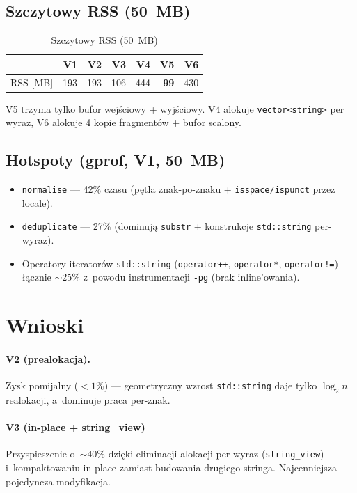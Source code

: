 \documentclass[11pt,a4paper]{article}
\begin{document}
\subsection{Szczytowy RSS (50~MB)}

\begin{table}[h]\centering
\begin{tabular}{lrrrrrr}
\toprule
  & V1 & V2 & V3 & V4 & V5 & V6 \\
\midrule
RSS [MB] & 193 & 193 & 106 & 444 & \textbf{99} & 430 \\
\bottomrule
\end{tabular}
\caption{Szczytowy RSS (50~MB)}
V5 trzyma tylko bufor wejściowy + wyjściowy. V4 alokuje \texttt{vector<string>} per wyraz, V6 alokuje 4 kopie fragmentów + bufor scalony.
\end{table}

\subsection{Hotspoty (gprof, V1, 50~MB)}
\begin{itemize}\itemsep0pt
  \item \texttt{normalise} --- 42\% czasu (pętla znak-po-znaku + \texttt{isspace/ispunct} przez locale).
  \item \texttt{deduplicate} --- 27\% (dominują \texttt{substr} + konstrukcje \texttt{std::string} per-wyraz).
  \item Operatory iteratorów \texttt{std::string} (\texttt{operator++}, \texttt{operator*}, \texttt{operator!=}) --- łącznie $\sim$25\% z~powodu instrumentacji \texttt{-pg} (brak inline'owania).
\end{itemize}

\section{Wnioski}

\paragraph{V2 (prealokacja).} Zysk pomijalny ($<1\%$) --- geometryczny wzrost \texttt{std::string} daje tylko $\log_2 n$ realokacji, a~dominuje praca per-znak.

\paragraph{V3 (in-place + string\_view)} Przyspieszenie o~$\sim$40\% dzięki eliminacji alokacji per-wyraz (\texttt{string\_view}) i~kompaktowaniu in-place zamiast budowania drugiego stringa. Najcenniejsza pojedyncza modyfikacja.
\end{document}
